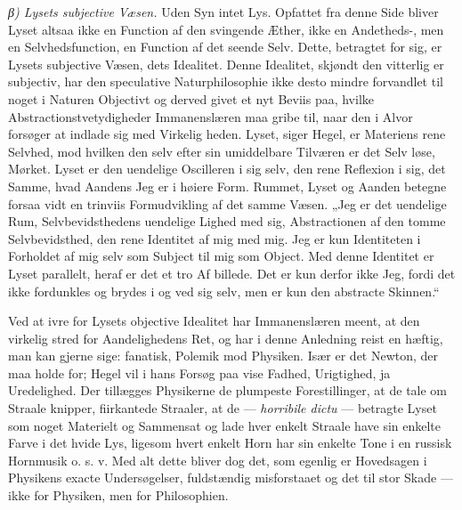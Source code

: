 \documentclass[12pt,a4paper]{book}
\newcommand{\subrunin}[1]{\emph{#1}\hspace{0.4em}}
\begin{document}
\subrunin{β) Lysets subjective Væsen.} Uden Syn intet Lys. Opfattet
fra denne Side bliver Lyset altsaa ikke en Function af den svingende
Æther, ikke en Andetheds-, men en Selvhedsfunction, en Function af det
seende Selv. Dette, betragtet for sig, er Lysets subjective Væsen, dets
Idealitet. Denne Idealitet, skjøndt den vitterlig er subjectiv, har den
speculative Naturphilosophie ikke desto mindre forvandlet til noget i
Naturen Objectivt og derved givet et nyt Beviis paa, hvilke
Abstractionstvetydigheder Immanenslæren maa gribe til, naar den i Alvor
forsøger at indlade sig med Virkelig\-%
heden. Lyset, siger Hegel, er Materiens rene Selvhed, mod hvilken den
selv efter sin umiddelbare Tilværen er det Selv\-%
løse, Mørket. Lyset er den uendelige Oscilleren i sig selv, den rene
Reflexion i sig, det Samme, hvad Aandens Jeg er
i høiere Form. Rummet, Lyset og Aanden betegne forsaa\-%
vidt en trinviis Formudvikling af det samme Væsen. „Jeg er det
uendelige Rum, Selvbevidsthedens uendelige Lighed med sig,
Abstractionen af den tomme Selvbevidsthed, den rene Identitet af mig
med mig. Jeg er kun Identiteten i Forholdet af mig selv som Subject til
mig som Object. Med denne Identitet er Lyset parallelt, heraf er det et
tro Af\-%
billede. Det er kun derfor ikke Jeg, fordi det ikke fordunkles og
brydes i og ved sig selv, men er kun den abstracte Skinnen.“

Ved at ivre for Lysets objective Idealitet har Immanenslæren meent, at
den virkelig stred for Aandelighedens Ret, og har i denne Anledning
reist en hæftig, man kan gjerne sige: fanatisk, Polemik mod Physiken.
Især er det Newton, der maa holde for; Hegel vil i hans Forsøg
paa\-%
vise Fadhed, Urigtighed, ja Uredelighed. Der tillægges Physikerne de
plumpeste Forestillinger, at de tale om Straale\-%
knipper, fiirkantede Straaler, at de --- \textit{horribile dictu} ---
betragte Lyset som noget Materielt og Sammensat og lade hver enkelt
Straale have sin enkelte Farve i det hvide Lys, ligesom hvert enkelt
Horn har sin enkelte Tone i en russisk Hornmusik o. s. v. Med alt dette
bliver dog det, som egenlig er Hovedsagen i Physikens exacte
Undersøgelser, fuldstændig misforstaaet og det til stor Skade --- ikke
for Physiken, men for Philosophien.
\end{document}
